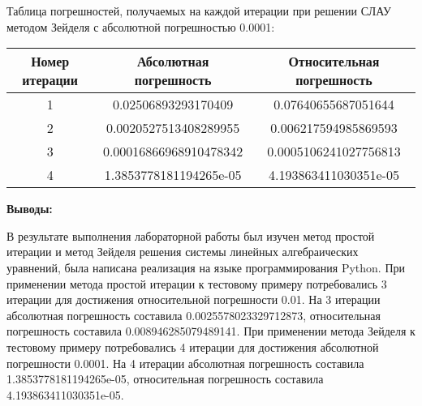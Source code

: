 \documentclass [12pt]{article}
\begin{document}
Таблица погрешностей, получаемых на каждой итерации при решении СЛАУ методом Зейделя с абсолютной погрешностью 0.0001:
\begin{center}
\begin{tabular}{|c|c|c|}
\hline
Номер итерации & Абсолютная погрешность & Относительная погрешность \\
\hline
1 & 0.02506893293170409 & 0.07640655687051644\\
\hline
2 & 0.0020527513408289955 & 0.006217594985869593\\
\hline
3 & 0.00016866968910478342 & 0.0005106241027756813\\
\hline
4 & 1.3853778181194265e-05 & 4.193863411030351e-05\\
\hline
\end{tabular}
\end{center}


\textbf{Выводы:}

В результате выполнения лабораторной работы был изучен метод простой итерации и метод Зейделя решения системы линейных алгебраических уравнений, была написана реализация на языке программирования Python. При применении метода простой итерации к тестовому примеру потребовались 3 итерации для достижения относительной погрешности 0.01. На 3 итерации абсолютная погрешность составила 0.0025578023329712873, относительная погрешность составила 0.008946285079489141. При применении метода Зейделя к тестовому примеру потребовались 4 итерации для достижения абсолютной погрешности 0.0001. На 4 итерации абсолютная погрешность составила 1.3853778181194265e-05, относительная погрешность составила 4.193863411030351e-05.
\end{document}
